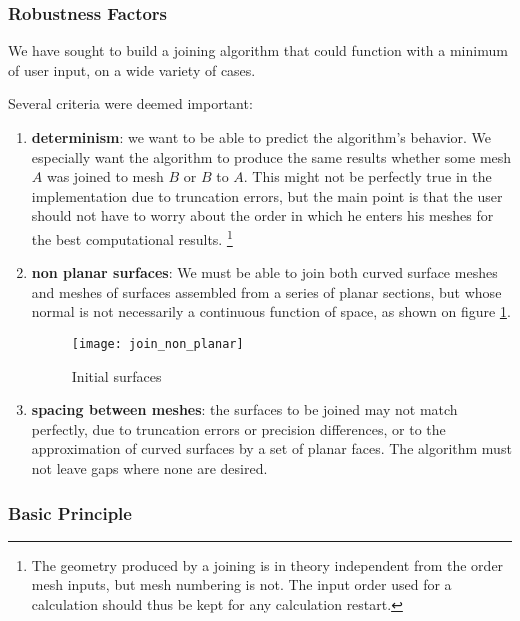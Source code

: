 \subsubsection{Robustness Factors%
               \label{sec:join.robust}}

We have sought to build a joining algorithm that could function with
a minimum of user input, on a wide variety of cases.

Several criteria were deemed important:

\begin{enumerate}

\item {\bf determinism}: we want to be able to predict the algorithm's behavior.
We especially want the algorithm to produce the same results whether
some mesh $A$ was joined to mesh $B$ or $B$ to $A$. This might not be perfectly
true in the implementation due to truncation errors, but the main point is
that the user should not have to worry about the order in which he enters
his meshes for the best computational results.
\footnote{The geometry produced by a joining is in theory independent
from the order mesh inputs, but mesh numbering is not. The input order
used for a calculation should thus be kept for any calculation restart.}

\item {\bf non planar surfaces}: We must be able to join both curved surface
meshes and meshes of surfaces assembled from a series of planar sections,
but whose normal is not necessarily a continuous function of space,
as shown on figure \ref{fig:algo.join.non_planar}.

\begin{figure}[!h]
\centerline{
\texttt{[image: join\_non\_planar]}}
\caption{Initial surfaces}
\label{fig:algo.join.non_planar}
\end{figure}

\item {\bf spacing between meshes}: the surfaces to be joined may
not match perfectly, due to truncation errors or precision differences,
or to the approximation of curved surfaces by a set of planar faces.
The algorithm must not leave gaps where none are desired.

\end{enumerate}

\subsubsection{Basic Principle\label{sec:join.principe}}

